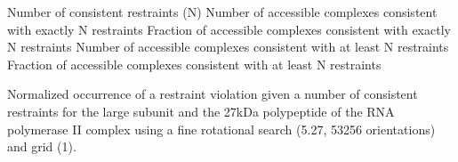 \bTABLE
\bTABLEhead
\bTR
\bTD Number of consistent restraints (N) \eTD 
\bTD Number of accessible complexes consistent with exactly N restraints \eTD 
\bTD Fraction of accessible complexes consistent with exactly N restraints \eTD 
\bTD Number of accessible complexes consistent with at least N restraints \eTD 
\bTD Fraction of accessible complexes consistent with at least N restraints \eTD
\eTR
\eTABLEhead
\bTABLEbody
\bTR
{}    \eTD {}    \eTD {}  \eTD {}  \eTD {} \eTD
\eTR
\bTR
{}    \eTD {}     \eTD {}  \eTD {}   \eTD {} \eTD
\eTR
\bTR
{}    \eTD {}      \eTD {}  \eTD {}    \eTD {} \eTD
\eTR
\bTR
{}    \eTD {}      \eTD {}  \eTD {}    \eTD {} \eTD
\eTR
\bTR
{}    \eTD {}       \eTD {}  \eTD {}     \eTD {} \eTD
\eTR
\bTR
{}    \eTD {}       \eTD {}  \eTD {}     \eTD {} \eTD
\eTR
\bTR
{}    \eTD {}        \eTD {}  \eTD {}      \eTD {} \eTD
\eTR
\bTR
{}    \eTD {}           \eTD {}  \eTD {}         \eTD {} \eTD
\eTR
\bTR
{}    \eTD {}              \eTD {}  \eTD {}            \eTD {} \eTD
\eTR
\eTABLEbody
\eTABLE
\stopbuffer


\caption{}
{Normalized occurrence of a restraint violation given a number of consistent
restraints for the large subunit and the 27kDa polypeptide of the RNA
polymerase II complex using a fine rotational search (5.27\Deg, 53256
orientations) and grid (1\Angstrom).}
\stopbuffer

